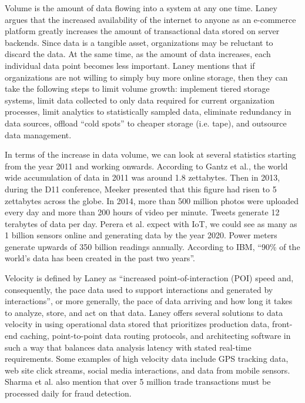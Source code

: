 \documentclass[]{article}
\begin{document}
Volume is the amount of data flowing into a system at any one time. Laney argues that the increased availability of the internet to anyone as an e-commerce platform greatly increases the amount of transactional data stored on server backends. Since data is a tangible asset, organizations may be reluctant to discard the data. At the same time, as the amount of data increases, each individual data point becomes less important. Laney mentions that if organizations are not willing to simply buy more online storage, then they can take the following steps to limit volume growth: implement tiered storage systems, limit data collected to only data required for current organization processes, limit analytics to statistically sampled data, eliminate redundancy in data sources, offload ``cold spots'' to cheaper storage (i.e. tape), and outsource data management. 

In terms of the increase in data volume, we can look at several statistics starting from the year 2011 and working onwards. According to Gantz et al.\cite{gantz_extracting_2011}, the world wide accumulation of data in 2011  was around 1.8 zettabytes. Then in 2013, during the D11 conference, Meeker presented that this figure had risen to 5 zettabytes across the globe. In 2014, more than 500 million photos were uploaded every day and more than 200 hours of video per minute\cite{pcast}. Tweets generate 12 terabytes of data per day\cite{sharma_extended_2015}.  Perera et al.\cite{perera_sensing_2014} expect with IoT, we could see as many as 1 billion sensors online and generating data by the year 2020. Power meters generate upwards of 350 billion readings annually\cite{sharma_extended_2015}. According to IBM\cite{ibm}, ``90\% of the world's data has been created in the past two years''. 

Velocity is defined by Laney as ``increased point-of-interaction (POI) speed and, consequently, the pace data used to support interactions and generated by interactions'', or more generally, the pace of data arriving and how long it takes to analyze, store, and act on that data. Laney offers several solutions to data velocity in using operational data stored that prioritizes production data, front-end caching, point-to-point data routing protocols, and architecting software in such a way that balances data analysis latency with stated real-time requirements. Some examples of high velocity data include GPS tracking data, web site click streams, social media interactions, and data from mobile sensors\cite{pcast}. Sharma et al.\cite{sharma_extended_2015} also mention that over 5 million trade transactions must be processed daily for fraud detection. 
\end{document}
